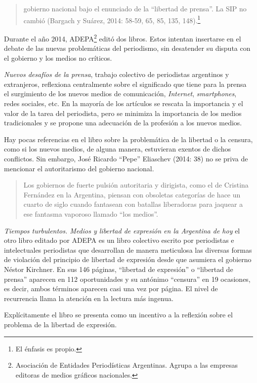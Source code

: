 \begin{quote}
gobierno nacional bajo el enunciado de la \enquote{libertad de prensa}. La SIP no cambió (Bargach y Suárez, 2014: 58-59, 65, 85, 135, 148).\footnote{El énfasis es propio.}
\end{quote}

Durante el año 2014, ADEPA\footnote{Asociación de Entidades Periodísticas Argentinas. Agrupa a las empresas editoras de medios gráficos nacionales.} editó dos libros. Estos intentan insertarse en el debate de las nuevas problemáticas del periodismo, sin desatender su disputa con el gobierno y los medios no críticos.

\emph{Nuevos desafíos de la prensa}, trabajo colectivo de periodistas argentinos y extranjeros, reflexiona centralmente sobre el significado que tiene para la prensa el surgimiento de los nuevos medios de comunicación, \emph{Internet}, \emph{smartphones}, redes sociales, etc. En la mayoría de los artículos se rescata la importancia y el valor de la tarea del periodista, pero se minimiza la importancia de los medios tradicionales y se propone una adecuación de la profesión a los nuevos medios.

Hay pocas referencias en el libro sobre la problemática de la libertad o la censura, como si los nuevos medios, de alguna manera, estuvieran exentos de dichos conflictos. Sin embargo, José Ricardo \enquote{Pepe} Eliaschev (2014: 38) no se priva de mencionar el autoritarismo del gobierno nacional.

\begin{quote}
Los gobiernos de fuerte pulsión autoritaria y dirigista, como el de Cristina Fernández en la Argentina, piensan con obsoletas categorías de hace un cuarto de siglo cuando fantasean con batallas liberadoras para jaquear a ese fantasma vaporoso llamado \enquote{los medios}.
\end{quote}

\emph{Tiempos turbulentos. Medios y libertad de expresión en la Argentina de hoy} el otro libro editado por ADEPA es un libro colectivo escrito por periodistas e intelectuales periodistas que desarrollan de manera meticulosa las diversas formas de violación del principio de libertad de expresión desde que asumiera el gobierno Néstor Kirchner. En sus 146 páginas, \enquote{libertad de expresión} o \enquote{libertad de prensa} aparecen en 112 oportunidades y su antónimo \enquote{censura} en 19 ocasiones, es decir, ambos términos aparecen casi una vez por página. El nivel de recurrencia llama la atención en la lectura más ingenua.

Explícitamente el libro se presenta como un incentivo a la reflexión sobre el problema de la libertad de expresión.

